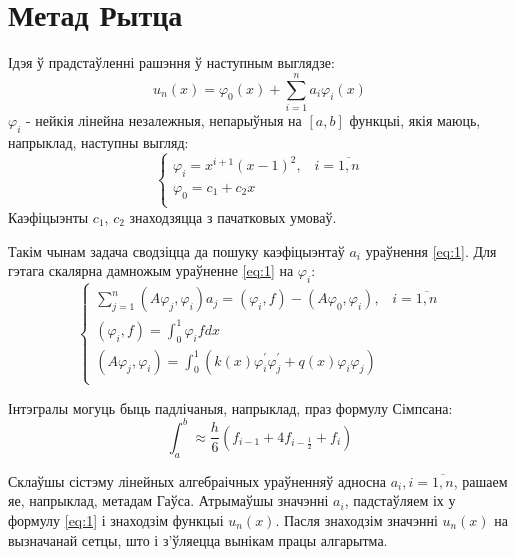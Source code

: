 \section{Метад Рытца}
Ідэя ў прадстаўленні рашэння ў наступным выглядзе:
\begin{equation} \label{eq:1}
    u_n(x) = \varphi_0(x) + \sum_{i=1}^n a_{i}\varphi_{i}(x)
\end{equation}
$\varphi_{i}$ - нейкія лінейна незалежныя, непарыўныя на $[a, b]$ функцыі, якія маюць, напрыклад, наступны выгляд:
\begin{equation}
    \begin{cases}
        \varphi_i = x^{i+1}(x-1)^2, \hspace{10pt} i = \overline{1,n} \\
        \varphi_0 = c_1 + c_{2}x \\
    \end{cases}
\end{equation}
Каэфіцыэнты $c_{1}$, $c_{2}$ знаходзяцца з пачатковых умоваў.

Такім чынам задача сводзіцца да пошуку каэфіцыэнтаў $a_{i}$ ураўнення \eqref{eq:1}. Для гэтага скалярна дамножым ураўненне \eqref{eq:1} на $\varphi_i$:
\begin{equation}
    \begin{cases}
        \sum_{j=1}^n(A\varphi_j, \varphi_i)a_j = (\varphi_i, f) - (A\varphi_0, \varphi_i), \hspace{10pt} i = \overline{1,n} \\
        (\varphi_i, f) = \int_0^1\varphi_i f dx \\
        (A\varphi_j, \varphi_i) = \int_0^1(k(x)\varphi_i^{\prime}\varphi_j^{\prime} + q(x)\varphi_i\varphi_j) \\
    \end{cases}
\end{equation}

Інтэгралы могуць быць падлічаныя, напрыклад, праз формулу Сімпсана:
\begin{equation}
    \int_a^b \approx \frac{h}{6}(f_{i-1} + 4f_{i-\frac{1}{2}} + f_i)
\end{equation}

Склаўшы сістэму лінейных алгебраічных ураўненняў адносна $a_i, i = \overline{1,n}$, рашаем яе, напрыклад, метадам Гаўса. Атрымаўшы значэнні $a_i$, падстаўляем іх у формулу \eqref{eq:1} і знаходзім функцыі $u_{n}(x)$. Пасля знаходзім значэнні $u_{n}(x)$ на вызначанай сетцы, што і з'ўляецца вынікам працы алгарытма.

